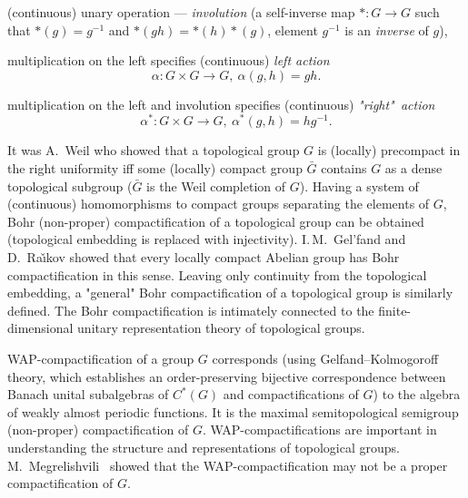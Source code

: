 \documentclass{amsart}
\begin{document}
\medskip

(continuous) unary operation --- {\it involution} (a se{\rm l}f-inverse map $*:G\to G$ such that $*(g)=g^{-1}$ and $*(gh)=*(h)*(g)$, element $g^{-1}$ is an {\it inverse} of $g$), 

\medskip

multiplication on the left specifies (continuous) {\it left action} 
$$\alpha: G\times G\to G,\ \alpha (g , h)=gh.$$ 

multiplication on the left and involution specifies (continuous) {\it "right"\ action} 
$$\alpha^*: G\times G\to G,\ \alpha^* (g , h)=hg^{-1}.$$ 

It was A.~Weil who showed that a topological group $G$ is (locally) precompact in the right uniformity iff some (locally) compact group $\bar G$ contains $G$ as a dense topological subgroup ($\bar G$ is the Weil completion of $G$). Having a system of (continuous) homomorphisms to compact groups separating the elements of $G$, Bohr (non-proper) compactification of a topological group can be obtained (topological embedding is replaced with injectivity). I.\,M.~Gel'fand and D.~Ra\v{\i}kov showed that every locally compact Abelian group has Bohr compactification in this sense. Leaving only continuity from the topological embedding, a "general" Bohr compactification of a topological group is similarly defined. The Bohr compactification is intimately connected to the finite-dimensional unitary representation theory of topological groups.

WAP-compactification of a group $G$ corresponds (using Gelfand--Kolmogoroff theory, which establishes an order-preserving bijective correspondence between Banach unital subalgebras of $C^*(G)$ and compactifications of $G$) to the algebra of weakly almost periodic functions. It is the maximal semitopological semigroup (non-proper) compactification of $G$. WAP-compactifications are important in understanding the structure and representations of topological groups.  M.~Megrelishvili~\cite{Megr2001} showed that the WAP-compactification may not be a proper compactification of $G$.
\end{document}
